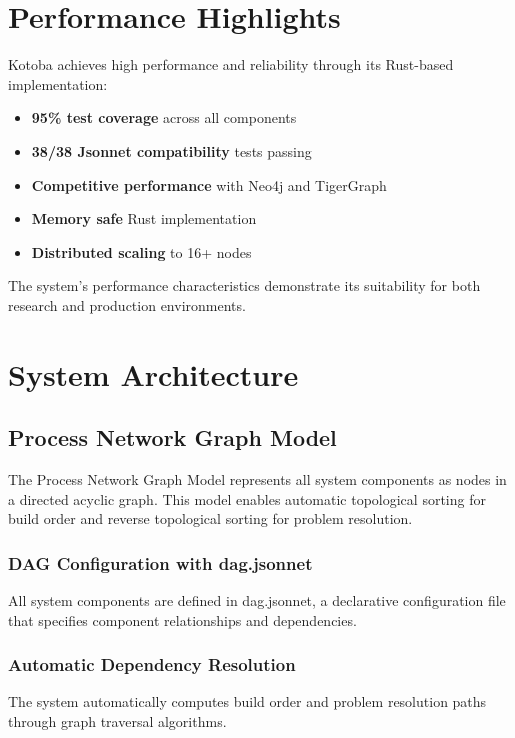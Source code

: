 \documentclass[11pt,a4paper]{article}
\begin{document}
\section{Performance Highlights}
\label{sec:performance}

Kotoba achieves high performance and reliability through its Rust-based implementation:

\begin{itemize}
\item \textbf{95\% test coverage} across all components
\item \textbf{38/38 Jsonnet compatibility} tests passing
\item \textbf{Competitive performance} with Neo4j and TigerGraph
\item \textbf{Memory safe} Rust implementation
\item \textbf{Distributed scaling} to 16+ nodes
\end{itemize}

The system's performance characteristics demonstrate its suitability for both research and production environments.

\section{System Architecture}
\label{sec:architecture}

\subsection{Process Network Graph Model}
The Process Network Graph Model represents all system components as nodes in a directed acyclic graph. This model enables automatic topological sorting for build order and reverse topological sorting for problem resolution.

\subsubsection{DAG Configuration with dag.jsonnet}
All system components are defined in dag.jsonnet, a declarative configuration file that specifies component relationships and dependencies.

\subsubsection{Automatic Dependency Resolution}
The system automatically computes build order and problem resolution paths through graph traversal algorithms.
\end{document}
